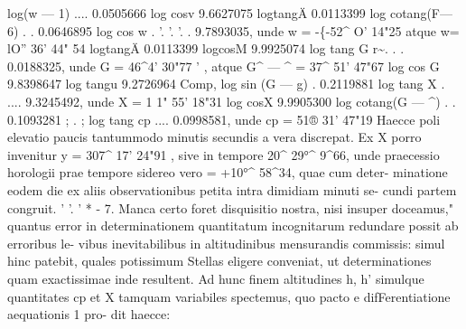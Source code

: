 \documentclass[12pt,a4paper]{article}
\begin{document}
log(w  --- 1)        ....      0.0505666
log  cosv
9.6627075
logtangÄ
0.0113399
log  cotang(F--- 6)   .      .      0.0646895
log  cos w    .     '.     '.     '.     .     9.7893035,  unde    w  = -\{-52\^{}    O'  14"25
atque    w=        lO''  36' 44" 54
logtangÄ
0.0113399
logcosM
9.9925074
log  tang  G      r\textasciitilde{}.      .      .      0.0188325,    unde    G  =  46\^{}4' 30"77  '     ,
atque    G\^{}  ---  \^{}  =  37\^{}  51' 47"67
log  cos  G
9.8398647
log  tangu
9.2726964
Comp,  log  sin (G  ---  g)  .      0.2119881
log  tang X  .     ....      9.3245492,    unde    X  =  1 1"  55'  18"31
log  cosX
9.9905300
log  cotang(G  --- \^{})  .      .     0.1093281  ;    .  ;
log  tang cp       ....      0.0998581,    unde    cp  =  51®  31' 47"19
Haecce  poli  elevatio  paucis  tantummodo  minutis  secundis  a  vera  discrepat.  Ex
X  porro  invenitur  y  =  307\^{}  17'  24"91 ,  sive  in  tempore  20\^{}  29°\^{}  9\^{}66,  unde
praecessio  horologii  prae  tempore  sidereo  vero  =  +10°\^{}  58\^{}34,  quae  cum  deter-
minatione  eodem  die  ex  aliis  observationibus  petita  intra  dimidiam  minuti  se-
cundi  partem  congruit.  '  '.  '           *  -
7.
Manca  certo  foret  disquisitio  nostra,  nisi  insuper  doceamus,"  quantus  error
in  determinationem  quantitatum  incognitarum  redundare  possit  ab  erroribus  le-
vibus  inevitabilibus  in  altitudinibus  mensurandis  commissis:  simul  hinc  patebit,
quales  potissimum  Stellas  eligere  conveniat,  ut  determinationes  quam  exactissimae
inde  resultent.  Ad  hunc  finem  altitudines  h,  h'  simulque  quantitates  cp  et  X
tamquam  variabiles  spectemus,  quo  pacto  e  difFerentiatione  aequationis  1  pro-
dit  haecce:

\newpage
\end{document}
